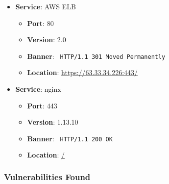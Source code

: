 \documentclass{article}
\begin{document}
\begin{itemize}
    
        \item \textbf{Service}: AWS ELB
        \begin{itemize}
            \item \textbf{Port}: 80
            \item \textbf{Version}:  2.0 
            \item \textbf{Banner}: \texttt{ HTTP/1.1 301 Moved Permanently
 }
            \item \textbf{Location}: \href{ https://63.33.34.226:443/ }{ https://63.33.34.226:443/ }
        \end{itemize}
    
        \item \textbf{Service}: nginx
        \begin{itemize}
            \item \textbf{Port}: 443
            \item \textbf{Version}:  1.13.10 
            \item \textbf{Banner}: \texttt{ HTTP/1.1 200 OK
 }
            \item \textbf{Location}: \href{ / }{ / }
        \end{itemize}
    
\end{itemize}


\subsubsection*{Vulnerabilities Found}
\end{document}

